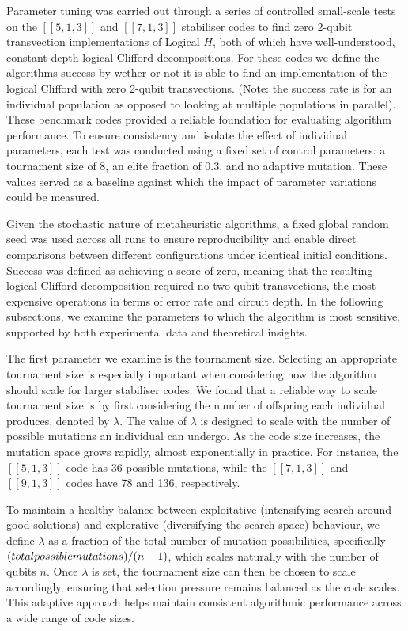 Parameter tuning was carried out through a series of controlled small-scale tests on the \([[5,1,3]]\) and \([[7,1,3]]\) stabiliser codes to find zero 2-qubit transvection implementations of Logical \(H\), both of which have well-understood, constant-depth logical Clifford decompositions. For these codes we define the algorithms success by wether or not it is able to find an implementation of the logical Clifford with zero 2-qubit transvections. (Note: the success rate is for an individual population as opposed to looking at multiple populations in parallel). These benchmark codes provided a reliable foundation for evaluating algorithm performance. To ensure consistency and isolate the effect of individual parameters, each test was conducted using a fixed set of control parameters: a tournament size of 8, an elite fraction of 0.3, and no adaptive mutation. These values served as a baseline against which the impact of parameter variations could be measured.

Given the stochastic nature of metaheuristic algorithms, a fixed global random seed was used across all runs to ensure reproducibility and enable direct comparisons between different configurations under identical initial conditions. Success was defined as achieving a score of zero, meaning that the resulting logical Clifford decomposition required no two-qubit transvections, the most expensive operations in terms of error rate and circuit depth. In the following subsections, we examine the parameters to which the algorithm is most sensitive, supported by both experimental data and theoretical insights.

The first parameter we examine is the tournament size. Selecting an appropriate tournament size is especially important when considering how the algorithm should scale for larger stabiliser codes. We found that a reliable way to scale tournament size is by first considering the number of offspring each individual produces, denoted by \(\lambda\). The value of \(\lambda\) is designed to scale with the number of possible mutations an individual can undergo. As the code size increases, the mutation space grows rapidly, almost exponentially in practice. For instance, the \([[5,1,3]]\) code has 36 possible mutations, while the \([[7,1,3]]\) and \([[9,1,3]]\) codes have 78 and 136, respectively.

To maintain a healthy balance between exploitative (intensifying search around good solutions) and explorative (diversifying the search space) behaviour, we define \(\lambda\) as a fraction of the total number of mutation possibilities, specifically \((total\space possible\space mutations)/(n-1)\), which scales naturally with the number of qubits \(n\). Once \(\lambda\) is set, the tournament size can then be chosen to scale accordingly, ensuring that selection pressure remains balanced as the code scales. This adaptive approach helps maintain consistent algorithmic performance across a wide range of code sizes.


